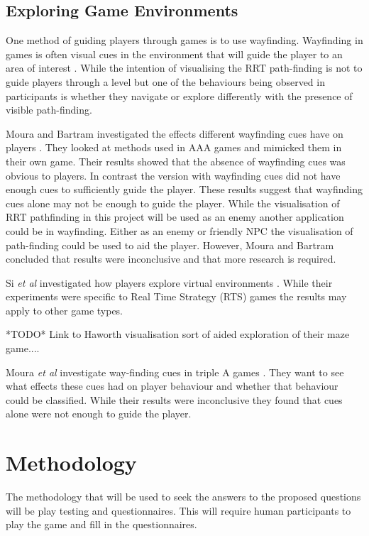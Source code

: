 \documentclass[journal]{IEEEtran}
\begin{document}
\subsection{Exploring Game Environments}
One method of guiding players through games is to use wayfinding. Wayfinding in games is often visual cues in the environment that will guide the player to an area of interest \cite{si2017, Bacim2008}. While the intention of visualising the RRT path-finding is not to guide players through a level but one of the behaviours being observed in participants is whether they  navigate or explore differently with the presence of visible path-finding. 

Moura and Bartram investigated the effects different wayfinding cues have on players \cite{moura2014}.  They looked at methods used in AAA games and mimicked them in their own game. Their results showed that the absence of wayfinding cues was obvious to players. In contrast the version with wayfinding cues did not have enough cues to sufficiently guide the player. These results suggest that wayfinding cues alone may not be enough to guide the player. While the visualisation of RRT pathfinding in this project will be used as an enemy another application could be in wayfinding. Either as an enemy or friendly NPC the visualisation of path-finding could be used to aid the player. However, Moura and Bartram concluded that results were inconclusive and that more research is required. 
 
Si \textit{et al} investigated how players explore virtual environments \cite{si2017}. While their experiments were specific to Real Time Strategy (RTS) games the results may apply to other game types.

*TODO* Link to Haworth visualisation sort of aided exploration of their maze game....


Moura \textit{et al} investigate way-finding cues in triple A games \cite{moura2014}. They want to see what effects these cues had on player behaviour and whether that behaviour could be classified. While their results were inconclusive they found that cues alone were not enough to guide the player.  

\section{Methodology} %
The methodology that will be used to seek the answers to the proposed questions will be play testing and questionnaires. This will require human participants to play the game and fill in the questionnaires. 
\end{document}
